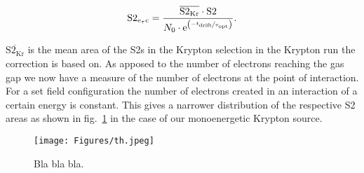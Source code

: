 \begin{equation}
    \mathrm{S2_\mathrm{e_\tau c}} = \frac{ \overline{\mathrm{S2_{Kr}}} \cdot \mathrm{S2} }{ N_0 \cdot \mathrm{e}^{ \left( \nicefrac{-t_\mathrm{drift}}{\tau_\mathrm{opt}} \right)} }.  %
\end{equation}

$ \overline{\mathrm{S2_{Kr}}} $ is the mean area of the S2s in the Krypton selection in the Krypton run the correction is based on.
As apposed to the number of electrons reaching the gas gap we now have a measure of the number of electrons at the point of interaction.
For a set field configuration the number of electrons created in an interaction of a certain energy is constant.
This gives a narrower distribution of the respective S2 areas as shown in fig.~\ref{fig:s2-area-hist-after-eltc} in the case of our monoenergetic Krypton source.


\begin{figure}
    \centering
    \texttt{[image: Figures/th.jpeg]}  %
    \caption[S2 area]{
        Bla bla bla.
    }
    \label{fig:s2-area-hist-after-eltc}
\end{figure}



